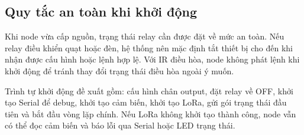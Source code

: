 \subsection{Quy tắc an toàn khi khởi động}
Khi node vừa cấp nguồn, trạng thái relay cần được đặt về mức an toàn. Nếu relay điều khiển quạt hoặc đèn, hệ thống nên mặc định tắt thiết bị cho đến khi nhận được cấu hình hoặc lệnh hợp lệ. Với IR điều hòa, node không phát lệnh khi khởi động để tránh thay đổi trạng thái điều hòa ngoài ý muốn.

Trình tự khởi động đề xuất gồm: cấu hình chân output, đặt relay về OFF, khởi tạo Serial để debug, khởi tạo cảm biến, khởi tạo LoRa, gửi gói trạng thái đầu tiên và bắt đầu vòng lặp chính. Nếu LoRa không khởi tạo thành công, node vẫn có thể đọc cảm biến và báo lỗi qua Serial hoặc LED trạng thái.
